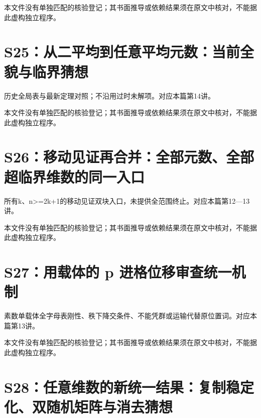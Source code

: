 \documentclass[11pt,a4paper,oneside,openany]{book}
\theoremstyle{definition}\newtheorem{example}[theorem]{例}\newtheorem{conjecture}[theorem]{猜想}
\numberwithin{equation}{chapter}\setcounter{tocdepth}{1}
\begin{document}
本文件没有单独匹配的核验登记；其书面推导或依赖结果须在原文中核对，不能据此虚构独立程序。

\section{S25：从二平均到任意平均元数：当前全貌与临界猜想}\label{source:S25}

历史全局表与最新定理对照；不沿用过时未解项。对应本篇第14讲。

\par{}\par

本文件没有单独匹配的核验登记；其书面推导或依赖结果须在原文中核对，不能据此虚构独立程序。

\section{S26：移动见证再合并：全部元数、全部超临界维数的同一入口}\label{source:S26}

所有k、n>=2k+1的移动见证双块入口，未提供全范围终止。对应本篇第12—13讲。

\par{}\par

本文件没有单独匹配的核验登记；其书面推导或依赖结果须在原文中核对，不能据此虚构独立程序。

\section{S27：用载体的 p 进格位移审查统一机制}\label{source:S27}

素数单载体全字母表刚性、秩下降交条件、不能凭群或运输代替原位置词。对应本篇第13讲。

\par{}\par

本文件没有单独匹配的核验登记；其书面推导或依赖结果须在原文中核对，不能据此虚构独立程序。

\section{S28：任意维数的新统一结果：复制稳定化、双随机矩阵与消去猜想}\label{source:S28}
\end{document}
